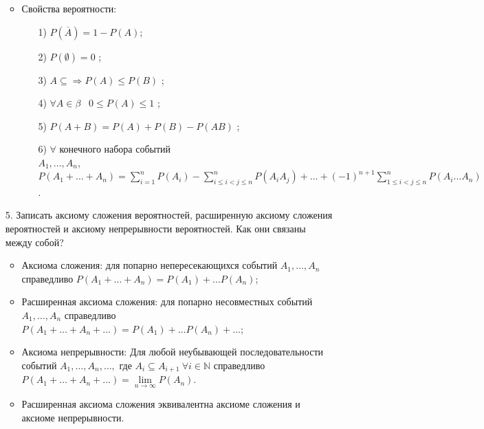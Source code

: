 \documentclass[a4paper]{article}
\begin{document}
\begin{enumerate}
\begin{itemize}
\item Свойства вероятности:
	\begin{enumerate}
	\item[1)] $P(\overline{A}) = 1 - P(A)$;
	\item[2)] $P(\emptyset) = 0$ ;
	\item[3)] $A \subseteq \Rightarrow P(A) \leqslant P(B)$ ;
	\item[4)] $\forall A \in \beta$ \ $0 \leqslant P(A) \leqslant 1$ ;
	\item[5)] $P(A+B) = P(A) + P(B) - P(AB)$ ;
	\item[6)] $\forall$ конечного набора событий \\
	$A_1, \ldots, A_n$, $P(A_1 + \ldots + A_n) = \sum\limits_{i = 1}^{n} P(A_i) - \sum\limits_{i \leqslant i < j \leqslant n}^{n} P(A_i A_j) + \ldots + (-1)^{n+1} \sum\limits_{1 \leqslant i < j \leqslant n}^{n} P(A_i \ldots A_n)$.
	\end{enumerate}
\end{itemize}



\item[5.] Записать аксиому сложения вероятностей, расширенную аксиому сложения вероятностей и аксиому непрерывности вероятностей. Как они связаны между собой? \\
\begin{itemize}
\item Аксиома сложения: для попарно непересекающихся событий $A_1, \ldots, A_n$ справедливо $P(A_1 + \ldots + A_n) = P(A_1) + \ldots  P(A_n)$;
\item Расширенная аксиома сложения: для попарно несовместных событий $A_1, \ldots, A_n$ справедливо $P(A_1 + \ldots + A_n + \ldots) = P(A_1) + \ldots P(A_n) + \ldots$;
\item Аксиома непрерывности: Для любой неубывающей последовательности событий $A_1, \ldots, A_n, \ldots,$ где $A_i \subseteq A_{i+1} \ \forall i \in \mathbb{N}$ справедливо $P(A_1 + \ldots + A_n + \ldots) = \lim\limits_{n \to \infty} P(A_n)$.
\item Расширенная аксиома сложения эквивалентна аксиоме сложения и аксиоме непрерывности.
\end{itemize}




\end{enumerate}
\end{document}
